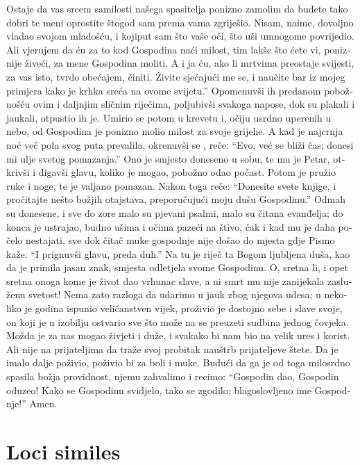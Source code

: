 \documentclass[a5paper,twoside]{article}
\begin{document}
\begin{pages}
\begin{Rightside}
\begin{croatian}
\pend
\pstart
Ostaje da vas srcem samilosti našega spasitelja ponizno zamolim da budete tako dobri te meni oprostite štogod sam prema vama zgriješio.  Nisam, naime, dovoljno vladao svojom mladošću, i kojiput sam što vaše oči, što uši umnogome povrijedio.  Ali vjerujem da ću za to kod Gospodina naći milost, tim lakše što ćete vi, poniznije živeći, za mene Gospodina moliti.  A i ja ću, ako li mrtvima preostaje svijesti, za vas isto, tvrdo obećajem, činiti.  Živite sjećajući me se, i naučite bar iz mojeg primjera kako je krhka sreća na ovome svijetu.''  
\pend
\pstart
Opomenuvši ih predanom pobožnošću ovim i daljnjim sličnim riječima, poljubivši svakoga napose, dok su plakali i jaukali, otpustio ih je.  Umirio se potom u krevetu i, očiju usrdno uperenih u nebo, od Gospodina je ponizno molio milost za svoje grijehe.  A kad je najcrnja noć već pola svog puta prevalila, okrenuvši se , reče: ``Evo, već se bliži čas; donesi mi ulje svetog pomazanja.''  Ono je smjesto doneseno u sobu, te mu je Petar, otkrivši i digavši glavu, koliko je mogao, pobožno odao počast. Potom je pružio ruke i noge, te je valjano pomazan. Nakon toga reče: ``Donesite svete knjige, i pročitajte nešto božjih otajstava, preporučujući moju dušu Gospodinu.''  Odmah su donesene, i sve do zore malo su pjevani psalmi, malo su čitana evanđelja; do konca je ustrajao, budno ušima i očima pazeći na štivo, čak i kad mu je daha počelo nestajati, sve dok čitač muke gospodnje nije došao do mjesta gdje Pismo kaže: ``I prignuvši glavu, preda duh.''  Na tu je riječ ta Bogom ljubljena duša, kao da je primila jasan znak, smjesta odletjela svome Gospodinu.
\pend
\pstart
O, sretna li, i opet sretna onoga kome je život dao vrhunac slave, a ni smrt mu nije zanijekala zasluženu svetost! Nema zato razloga da udarimo u jauk zbog njegova udesa; u nekoliko je godina ispunio veličanstven vijek, proživio je dostojno sebe i slave svoje, on koji je u izobilju ostvario sve što može na se preuzeti sudbina jednog čovjeka.  Možda je za nas mogao živjeti i duže, i svakako bi nam bio na velik ures i korist.  Ali nije na prijateljima da traže svoj probitak nauštrb prijateljeve štete.  Da je imalo dalje poživio, poživio bi za boli i muke.  Budući da ga je od toga milosrdno spasila božja providnost, njemu zahvalimo i recimo: ``Gospodin dao, Gospodin oduzeo! Kako se Gospodinu svidjelo, tako se zgodilo; blagoslovljeno ime Gospodnje!'' Amen.


\pend



\endnumbering
\end{croatian}
\end{Rightside}

\end{pages}
\Pages



\newpage

\section*{Loci similes}
\end{document}
